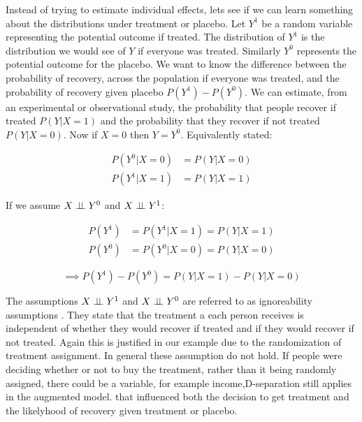 \documentclass[11pt,a4paper]{article}
\begin{document}
Instead of trying to estimate individual effects, lets see if we can learn something about the distributions under treatment or placebo.  Let $Y^{1}$ be a random variable representing the potential outcome if treated. The distribution of $Y^{1}$ is the distribution we would see of $Y$ if everyone was treated. Similarly $Y^{0}$ represents the potential outcome for the placebo. We want to know the difference between the probability of recovery, across the population if everyone was treated, and the probability of recovery given placebo  $P(Y^{1})-P(Y^{0})$. We can estimate, from an experimental or observational study, the probability that people recover if treated $P(Y|X=1)$ and the probability that they recover if not treated $P(Y|X=0)$. Now if $X=0$ then $Y = Y^{0}$. Equivalently stated:

\begin{equation}
\begin{aligned}
P(Y^{0}|X=0)&= P(Y|X=0)\\
P(Y^{1}|X=1)&=P(Y|X=1)
\end{aligned}
\end{equation}

If we assume $X \perp\!\!\!\perp Y^{0}$ and $X \perp\!\!\!\perp Y^{1}$:

\begin{equation}
\begin{aligned}
P(Y^{1}) &= P(Y^{1}|X=1) = P(Y|X=1) \\
P(Y^{0}) &= P(Y^{0}|X=0) = P(Y|X=0) 
\end{aligned}
\end{equation}

\begin{equation}
\implies P(Y^{1})-P(Y^{0}) = P(Y|X=1) - P(Y|X=0)
\end{equation}

The assumptions $X \perp\!\!\!\perp Y^{1}$ and $X \perp\!\!\!\perp Y^{0}$  are referred to as ignoreability assumptions \cite{Rosenbaum1983}. They state that the treatment a each person receives is independent of whether they would recover if treated and if they would recover if not treated. Again this is justified in our example due to the randomization of treatment assignment. In general these assumption do not hold. If people were deciding whether or not to buy the treatment, rather than it being randomly assigned, there could be a variable, for example income,D-separation still applies in the augmented model. that influenced both the decision to get treatment and the likelyhood of recovery given treatment or placebo.
\end{document}
